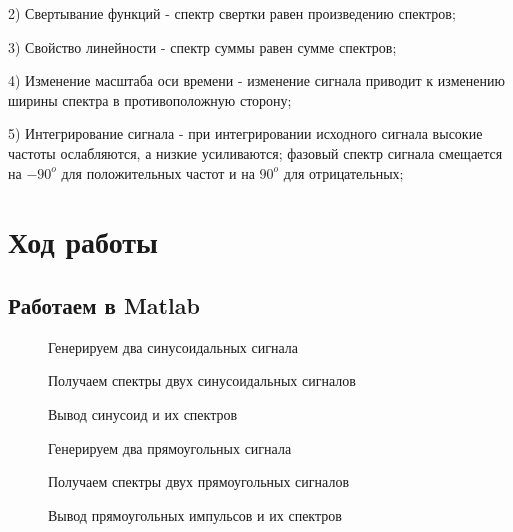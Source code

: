 \documentclass[12pt,a4paper]{scrartcl}
\begin{document}
2) Свертывание функций - спектр свертки равен произведению спектров;

3) Свойство линейности - спектр суммы равен сумме спектров;

4) Изменение масштаба оси времени - изменение сигнала приводит к изменению ширины спектра в противоположную сторону;

5) Интегрирование сигнала - при интегрировании исходного сигнала высокие частоты ослабляются, а низкие усиливаются; фазовый спектр сигнала смещается на $-90^o$ для положительных частот и на $90^o$ для отрицательных;


\newpage

\section{Ход работы}
\label{sec:work}

\subsection{Работаем в Matlab}
\label{sec:workMatlab}
\begin{figure}[h!]
\caption{Генерируем два синусоидальных сигнала}
\end{figure}

\begin{figure}[h!]
\caption{Получаем спектры двух синусоидальных сигналов}
\end{figure}

\begin{figure}[h!]
\caption{Вывод синусоид и их спектров}
\end{figure}
\newpage

\begin{figure}[h!]
\caption{Генерируем два прямоугольных сигнала}
\end{figure}
\newpage


\begin{figure}[h!]
\caption{Получаем спектры двух прямоугольных сигналов}
\end{figure}

\begin{figure}[h!]
\caption{Вывод прямоугольных импульсов и их спектров}
\end{figure}
\end{document}

